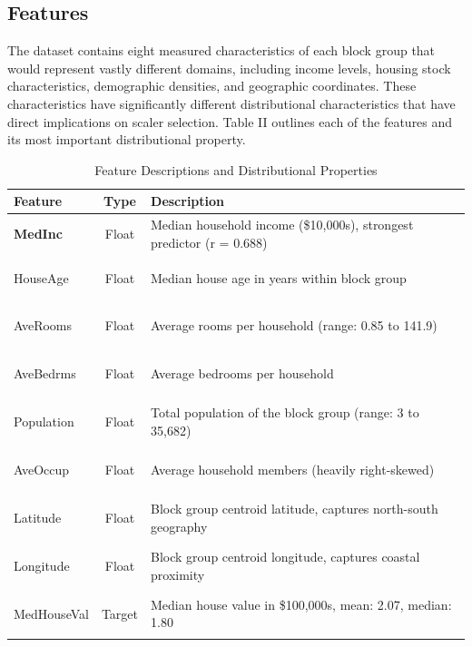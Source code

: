 \documentclass[pdflatex,sn-mathphys-num]{sn-jnl}
\begin{document}
\subsection{Features}
The dataset contains eight measured characteristics of each block group that would represent vastly different domains, including income levels, housing stock characteristics, demographic densities, and geographic coordinates. These characteristics have significantly different distributional characteristics that have direct implications on scaler selection. Table II outlines each of the features and its most important distributional property.

\begin{table}[h!]
\centering
\renewcommand{\arraystretch}{1.3}
\setlength{\tabcolsep}{10pt}

\caption{Feature Descriptions and Distributional Properties}
\begin{tabular}{|>{\bfseries}l|c|p{8cm}|}
\hline
\rowcolor[HTML]{2F4F7F}
\color{white} Feature & \color{white} Type & \multicolumn{1}{l|}{\color{white} Description} \\ \hline

\rowcolor[HTML]{E6E6E6}
MedInc & Float & Median household income (\$10,000s), strongest predictor (r = 0.688) \\ \hline

HouseAge & Float & Median house age in years within block group \\ \hline

\rowcolor[HTML]{E6E6E6}
AveRooms & Float & Average rooms per household (range: 0.85 to 141.9) \\ \hline

AveBedrms & Float & Average bedrooms per household \\ \hline

\rowcolor[HTML]{E6E6E6}
Population & Float & Total population of the block group (range: 3 to 35,682) \\ \hline

AveOccup & Float & Average household members (heavily right-skewed) \\ \hline

\rowcolor[HTML]{E6E6E6}
Latitude & Float & Block group centroid latitude, captures north-south geography \\ \hline

Longitude & Float & Block group centroid longitude, captures coastal proximity \\ \hline

\rowcolor[HTML]{E6E6E6}
MedHouseVal & Target & Median house value in \$100,000s, mean: 2.07, median: 1.80 \\ \hline

\end{tabular}
\end{table}
\end{document}
